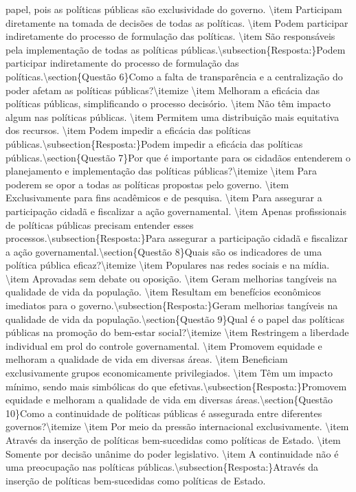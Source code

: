 \documentclass[
   article,       
   12pt,          
   oneside,       
   a4paper,       
   english,       
   brazil,        
   sumario=tradicional
   ]{abntex2}
\begin{document}
papel, pois as políticas públicas são exclusividade do governo.    \textbackslash{}item Participam diretamente na tomada de decisões de todas as políticas.    \textbackslash{}item Podem participar indiretamente do processo de formulação das políticas.    \textbackslash{}item São responsáveis pela implementação de todas as políticas públicas.\textbackslash{}subsection\{Resposta:\}Podem participar indiretamente do processo de formulação das políticas.\textbackslash{}section\{Questão 6\}Como a falta de transparência e a centralização do poder afetam as políticas públicas?\textbackslash{}itemize    \textbackslash{}item Melhoram a eficácia das políticas públicas, simplificando o processo decisório.    \textbackslash{}item Não têm impacto algum nas políticas públicas.    \textbackslash{}item Permitem uma distribuição mais equitativa dos recursos.    \textbackslash{}item Podem impedir a eficácia das políticas públicas.\textbackslash{}subsection\{Resposta:\}Podem impedir a eficácia das políticas públicas.\textbackslash{}section\{Questão 7\}Por que é importante para os cidadãos entenderem o planejamento e implementação das políticas públicas?\textbackslash{}itemize    \textbackslash{}item Para poderem se opor a todas as políticas propostas pelo governo.    \textbackslash{}item Exclusivamente para fins acadêmicos e de pesquisa.    \textbackslash{}item Para assegurar a participação cidadã e fiscalizar a ação governamental.    \textbackslash{}item Apenas profissionais de políticas públicas precisam entender esses processos.\textbackslash{}subsection\{Resposta:\}Para assegurar a participação cidadã e fiscalizar a ação governamental.\textbackslash{}section\{Questão 8\}Quais são os indicadores de uma política pública eficaz?\textbackslash{}itemize    \textbackslash{}item Populares nas redes sociais e na mídia.    \textbackslash{}item Aprovadas sem debate ou oposição.    \textbackslash{}item Geram melhorias tangíveis na qualidade de vida da população.    \textbackslash{}item Resultam em benefícios econômicos imediatos para o governo.\textbackslash{}subsection\{Resposta:\}Geram melhorias tangíveis na qualidade de vida da população.\textbackslash{}section\{Questão 9\}Qual é o papel das políticas públicas na promoção do bem-estar social?\textbackslash{}itemize    \textbackslash{}item Restringem a liberdade individual em prol do controle governamental.    \textbackslash{}item Promovem equidade e melhoram a qualidade de vida em diversas áreas.    \textbackslash{}item Beneficiam exclusivamente grupos economicamente privilegiados.    \textbackslash{}item Têm um impacto mínimo, sendo mais simbólicas do que efetivas.\textbackslash{}subsection\{Resposta:\}Promovem equidade e melhoram a qualidade de vida em diversas áreas.\textbackslash{}section\{Questão 10\}Como a continuidade de políticas públicas é assegurada entre diferentes governos?\textbackslash{}itemize    \textbackslash{}item Por meio da pressão internacional exclusivamente.    \textbackslash{}item Através da inserção de políticas bem-sucedidas como políticas de Estado.    \textbackslash{}item Somente por decisão unânime do poder legislativo.    \textbackslash{}item A continuidade não é uma preocupação nas políticas públicas.\textbackslash{}subsection\{Resposta:\}Através da inserção de políticas bem-sucedidas como políticas de Estado.
\end{document}
